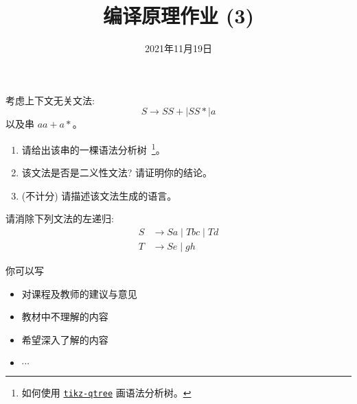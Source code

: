 \documentclass[a4paper, justified]{tufte-handout}
\title{编译原理作业 (3)}
\date{2021年11月19日}
\begin{document}
\maketitle
\noplagiarism %
\begin{abstract}
\end{abstract}
\beginrequired

\begin{problem}[\score{10 = 5 + 5}]
  考虑上下文无关文法:
  \[
    S \to S S + \mid S S \ast \mid a
  \]
  以及串 $a a + a \ast$。

  \begin{enumerate}[(1)]
    \item 请给出该串的一棵语法分析树~\footnote{如何使用 \href{https://mirrors.hit.edu.cn/CTAN/graphics/pgf/contrib/tikz-qtree/tikz-qtree-manual.pdf}{\texttt{tikz-qtree}} 画语法分析树。}。
    \item 该文法是否是二义性文法? 请证明你的结论。
    \item (不计分) 请描述该文法生成的语言。
  \end{enumerate}
\end{problem}

\begin{solution}
\end{solution}

\begin{problem}[\score{10}]
  请消除下列文法的左递归:
  \begin{align*}
    S &\to Sa \mid Tbc \mid Td \\[8pt]
    T &\to Se \mid gh
  \end{align*}
\end{problem}

\begin{solution}
\end{solution}



\beginfb

你可以写
\begin{itemize}
  \item 对课程及教师的建议与意见
  \item 教材中不理解的内容
  \item 希望深入了解的内容
  \item $\cdots$
\end{itemize}
\end{document}
